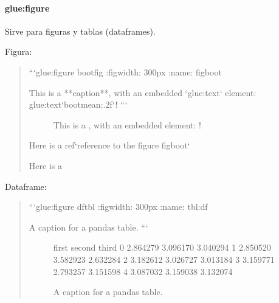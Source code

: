 \documentclass[letterpaper,10pt,english]{jupyterBook}
\begin{document}
\paragraph{glue:figure}
\label{\detokenize{docs/01_01_Code_Blocks:glue-figure}}
\sphinxAtStartPar
Sirve para figuras y tablas (dataframes).

\sphinxAtStartPar
Figura:
\begin{quote}

\begin{sphinxVerbatim}[commandchars=\\\{\}]
```\PYGZob{}glue:figure\PYGZcb{} boot\PYGZus{}fig
:figwidth: 300px
:name: \PYGZdq{}fig\PYGZhy{}boot\PYGZdq{}

This is a **caption**, with an embedded `\PYGZob{}glue:text\PYGZcb{}` element: \PYGZob{}glue:text\PYGZcb{}`boot\PYGZus{}mean:.2f`!
```
\end{sphinxVerbatim}

\begin{figure}[htbp]
\centering
\capstart

\noindent{}
\caption{This is a , with an embedded  element: !}\label{\detokenize{docs/01_01_Code_Blocks:fig-boot}}\end{figure}

\begin{sphinxVerbatim}[commandchars=\\\{\}]
Here is a \PYGZob{}ref\PYGZcb{}`reference to the figure \PYGZlt{}fig\PYGZhy{}boot\PYGZgt{}`
\end{sphinxVerbatim}

\sphinxAtStartPar
Here is a {\hyperref[\detokenize{docs/01_01_Code_Blocks:fig-boot}]{}}
\end{quote}

\sphinxAtStartPar
Dataframe:
\begin{quote}

\begin{sphinxVerbatim}[commandchars=\\\{\}]
```\PYGZob{}glue:figure\PYGZcb{} df\PYGZus{}tbl
:figwidth: 300px
:name: \PYGZdq{}tbl:df\PYGZdq{}

A caption for a pandas table.
```
\end{sphinxVerbatim}

\begin{figure}[htbp]
\centering
\capstart

\begin{sphinxVerbatim}[commandchars=\\\{\}]
      first    second     third
0  2.864279  3.096170  3.040294
1  2.850520  3.582923  2.632284
2  3.182612  3.026727  3.013184
3  3.159771  2.793257  3.151598
4  3.087032  3.159038  3.132074
\end{sphinxVerbatim}
\caption{A caption for a pandas table.}\label{\detokenize{docs/01_01_Code_Blocks:tbl-df}}\end{figure}
\end{quote}
\end{document}
